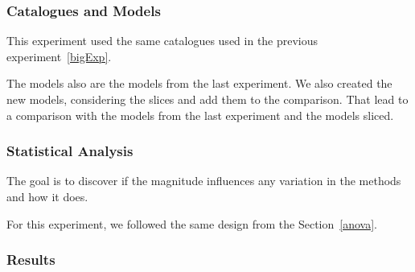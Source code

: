 \subsubsection{Catalogues and Models}
This experiment used the same catalogues used in the previous experiment~\ref{bigExp}. 

The models also are the models from the last experiment. We also created the new models, considering the slices and add them to the comparison. That lead to a comparison with the models from the last experiment and the models sliced.


\subsubsection{Statistical Analysis}
The goal is to discover if the magnitude influences any variation in the methods and how it does.

For this experiment, we followed the same design from the Section~\ref{anova}.

\subsubsection{Results}\label{Results}




